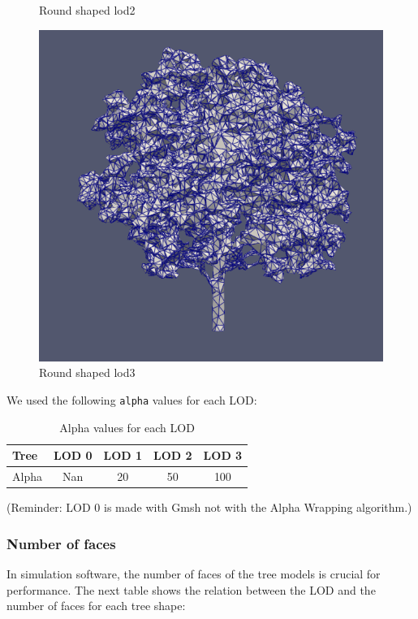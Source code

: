 \documentclass[12pt]{article}
\begin{document}
\begin{figure}[H]
\begin{minipage}{0.30\textwidth}
        \caption{Round shaped lod2}
    \end{minipage}
    \begin{minipage}{0.30\textwidth}
        \centering
        \includegraphics[width=1\textwidth]{images/tree-round_lod3.png}
        \caption{Round shaped lod3}
    \end{minipage}
\end{figure}


We used the following \texttt{alpha} values for each LOD:
\begin{table}[H]
    \centering
    \begin{tabular}{|l|c|c|c|c|}
    \hline
    Tree & LOD 0 & LOD 1 & LOD 2 & LOD 3 \\
    \hline
    Alpha & Nan & 20 & 50 & 100 \\
    \hline
    \end{tabular}
    \caption{Alpha values for each LOD}
    \label{tab:my_label}
\end{table}

(Reminder: LOD 0 is made with Gmsh not with the Alpha Wrapping algorithm.)

\subsubsection{Number of faces}
In simulation software, the number of faces of the tree models is crucial for
performance. The next table shows the relation between the LOD and the number of
 faces for each tree shape:
\end{document}
